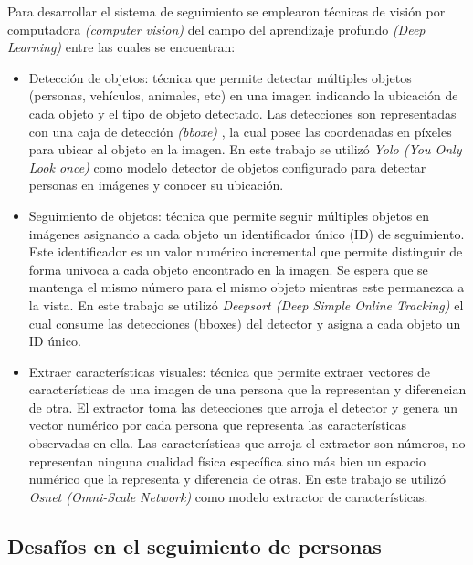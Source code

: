 \documentclass[a4paper]{IEEEtran}
\begin{document}
Para desarrollar el sistema de seguimiento se emplearon técnicas de visión por computadora \textit{(computer vision)} \cite{b6} del campo del aprendizaje profundo \textit{(Deep Learning)} \cite{b7} entre las cuales se encuentran:
\begin{itemize}
\item Detección de objetos: técnica que permite detectar múltiples objetos \cite{b8} (personas, vehículos, animales, etc) en una imagen indicando la ubicación de cada objeto y el tipo de objeto detectado. Las detecciones son representadas con una caja de detección \textit{(bboxe)} \cite{b9} , la cual posee las coordenadas en píxeles para ubicar al objeto en la imagen. En este trabajo se utilizó \textit{Yolo (You Only Look once)} \cite{b10} como modelo detector de objetos configurado para detectar personas en imágenes y conocer su ubicación.
\item Seguimiento de objetos: técnica que permite seguir múltiples objetos en imágenes \cite{b11} asignando a cada objeto un identificador único (ID) de seguimiento. Este identificador es un valor numérico incremental que permite distinguir de forma univoca a cada objeto encontrado en la imagen. Se espera que se mantenga el mismo número para el mismo objeto mientras este permanezca a la vista. En este trabajo se utilizó \textit{Deepsort (Deep Simple Online Tracking)} \cite{b12} el cual consume las detecciones (bboxes) del detector y asigna a cada objeto un ID único.
\item Extraer características visuales: técnica que permite extraer vectores de características de una imagen de una persona que la representan y diferencian de otra. El extractor toma las detecciones que arroja el detector y genera un vector numérico por cada persona que representa las características observadas en ella.  Las características que arroja el extractor son números, no representan ninguna cualidad física específica sino más bien un espacio numérico que la representa y diferencia de otras. En este trabajo se utilizó \textit{Osnet (Omni-Scale Network)} \cite{b13} como modelo extractor de características.
\end{itemize}

\subsection{Desafíos en el seguimiento de personas}
\end{document}
